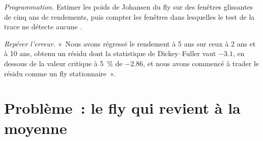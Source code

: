 \begin{exercise}[$\star\star\star$]\label{exo:qm:multivariate-series-and-cointegration:7}
\emph{Programmation.} Estimer les poids de Johansen du fly sur des fenêtres glissantes de cinq ans de rendements, puis compter les fenêtres dans lesquelles le test de la trace ne détecte aucune .
\end{exercise}

\begin{exercise}[$\star\star\star$]\label{exo:qm:multivariate-series-and-cointegration:8}
\emph{Repérer l'erreur.} «~Nous avons régressé le rendement à 5 ans sur ceux à 2 ans et à 10 ans, obtenu un résidu dont la statistique de Dickey--Fuller vaut $-3.1$, en dessous de la valeur critique à 5~\%
de $-2.86$, et nous avons commencé à trader le résidu comme un fly stationnaire~».
\end{exercise}

\section{Problème~: le fly qui revient à la moyenne}

